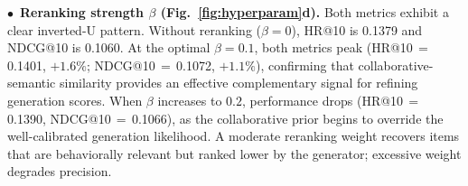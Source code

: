 \documentclass[sigconf, anonymous, review]{acmart}
\begin{document}
\noindent$\bullet$~\textbf{Reranking strength $\beta$ (Fig.~\ref{fig:hyperparam}d).}
%
Both metrics exhibit a clear inverted-U pattern.
%
Without reranking ($\beta\!=\!0$), HR@10 is 0.1379 and NDCG@10 is 0.1060.
%
At the optimal $\beta\!=\!0.1$, both metrics peak (HR@10$\,=\,$0.1401, $+1.6\%$; NDCG@10$\,=\,$0.1072, $+1.1\%$), confirming that collaborative-semantic similarity provides an effective complementary signal for refining generation scores.
%
When $\beta$ increases to $0.2$, performance drops (HR@10$\,=\,$0.1390, NDCG@10$\,=\,$0.1066), as the collaborative prior begins to override the well-calibrated generation likelihood.
%
A moderate reranking weight recovers items that are behaviorally relevant but ranked lower by the generator; excessive weight degrades precision.

%
%
\end{document}
